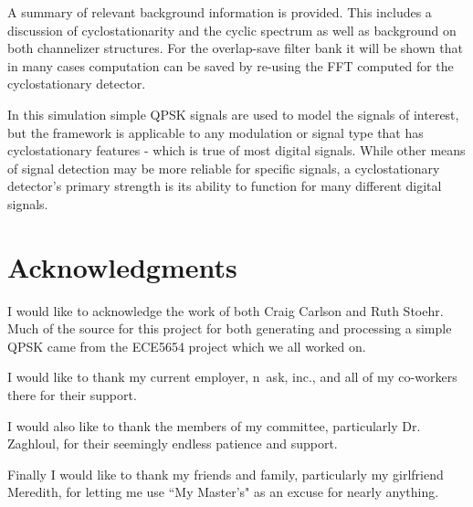 \documentclass[12pt,dvips]{report}
\begin{document}
A summary of relevant background information is provided.  This includes a
discussion of cyclostationarity and the cyclic spectrum as well as background
on both channelizer structures. For the overlap-save filter bank it will be 
shown that in many cases computation can be saved by re-using the FFT computed
for the cyclostationary detector.

In this simulation simple QPSK signals are used to model the signals of 
interest, but the framework is applicable to any modulation or signal type
that has cyclostationary features - which is true of most digital signals. 
While other means of signal detection may be more reliable for specific signals,
a cyclostationary detector's primary strength is its ability to function for many
different digital signals.

\vfill



\pagebreak

\chapter*{Acknowledgments}
I would like to acknowledge the work of both Craig Carlson and Ruth Stoehr. Much
of the source for this project for both generating and processing a simple QPSK
came from the ECE5654 project which we all worked on.

I would like to thank my current employer, n~ask, inc., and all of my co-workers
there for their support.

I would also like to thank the members of my committee, particularly Dr.
Zaghloul, for their seemingly endless patience and support.

Finally I would like to thank my friends and family, particularly my girlfriend Meredith, for letting me use ``My Master's" as an excuse for nearly anything.

\tableofcontents
\pagebreak

\listoffigures
\pagebreak

\listoftables
\pagebreak

\pagestyle{myheadings}
\end{document}
